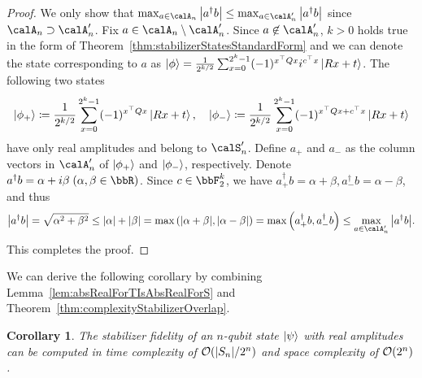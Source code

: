 \documentclass[aps,prx,onecolumn,superscriptaddress,nobibnotes,nofootinbib]{revtex4-2}
\newcommand{\defeq}{\coloneqq}
\newtheorem{corollary}{Corollary}
\begin{document}
\begin{proof}
  We only show that $\max_{a\in \calA_n} \abs{a^\dagger b} \leq \max_{a\in \calA'_n} \abs{a^\dagger b}$ since $\calA_n \supset \calA'_n$.
  Fix $a \in \calA_n \setminus \calA'_n$.
  Since $a \not\in \calA'_n$, $k>0$ holds true in the form of Theorem~\ref{thm:stabilizerStatesStandardForm} and we can denote the state corresponding to $a$ as
  $\ket{\phi} = \frac{1}{2^{k/2}}\sum_{x=0}^{2^k-1} (-1)^{x^\top Q x} i^{c^\top x} \ket{Rx+t}$.
  The following two states
  \begin{equation*}
    \ket{\phi_+} \defeq \frac{1}{2^{k/2}}\sum_{x=0}^{2^k-1} (-1)^{x^\top Q x} \ket{Rx+t}, \quad
    \ket{\phi_-} \defeq \frac{1}{2^{k/2}}\sum_{x=0}^{2^k-1} (-1)^{x^\top Q x + c^\top x} \ket{Rx+t}
  \end{equation*}
  have only real amplitudes and belong to $\calS'_n$.
  Define $a_+$ and $a_-$ as the column vectors in $\calA'_n$ of $\ket{\phi_+}$ and $\ket{\phi_-}$, respectively.
  Denote $a^\dagger b = \alpha + i\beta \; (\alpha, \beta \in \bbR)$.
  Since $c\in \bbF_2^k$, we have $a_+^\dagger b = \alpha+\beta, a_-^\dagger b = \alpha-\beta$, and thus
  \begin{equation*}
    \abs{a^\dagger b}
    =\sqrt{\alpha^2 + \beta^2}
    \leq \abs{\alpha}+\abs{\beta}
    = \max\qty(\abs{\alpha+\beta}, \abs{\alpha-\beta})
    = \max\qty(a_+^\dagger b, a_-^\dagger b)
    \leq \max_{a \in \calA'_n} \abs{a^\dagger b}.
  \end{equation*}
  This completes the proof.
\end{proof}
We can derive the following corollary by combining Lemma~\ref{lem:absRealForTIsAbsRealForS} and Theorem~\ref{thm:complexityStabilizerOverlap}.
\begin{corollary}
  The stabilizer fidelity of an $n$-qubit state $\ket{\psi}$ with real amplitudes can be computed in time complexity of $\order{\abs{S_n}/2^n}$ and space complexity of $\order{2^n}$.
\end{corollary}
\end{document}
